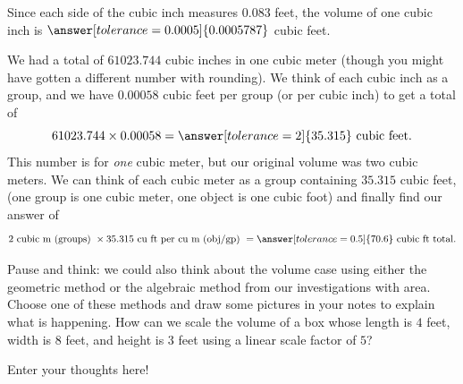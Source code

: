 \documentclass{ximera}
\begin{document}
\begin{question}
\begin{explanation}
\begin{image}
\begin{tikzpicture}
\end{tikzpicture}
\end{image}
Since each side of the cubic inch measures $0.083$ feet, the volume of one cubic inch is $\answer[tolerance=0.0005]{0.0005787}$ cubic feet.

We had a total of $61023.744$ cubic inches in one cubic meter (though you might have gotten a different number with rounding). We think of each cubic inch as a group, and we have  $0.00058$ cubic feet per group (or per cubic inch) to get a total of
\[
61023.744 \times 0.00058 = \answer[tolerance=2]{35.315} \textrm{ cubic feet.}
\]
This number is for \emph{one} cubic meter, but our original volume was two cubic meters. We can think of each cubic meter as a group containing $35.315$ cubic feet, (one group is one cubic meter, one object is one cubic foot) and finally find our answer of
\[
2 \textrm{ cubic m (groups) } \times 35.315 \textrm{ cu ft per cu m (obj/gp) } = \answer[tolerance=0.5]{70.6} \textrm{ cubic ft total.}
\]

\end{explanation}
\end{question}

\begin{question}
Pause and think: we could also think about the volume case using either the geometric method or the algebraic method from our investigations with area. Choose one of these methods and draw some pictures in your notes to explain what is happening. How can we scale the volume of a box whose length is $4$ feet, width is $8$ feet, and height is $3$ feet using a linear scale factor of $5$?
\begin{freeResponse}
Enter your thoughts here!
\end{freeResponse}
\end{question}
\end{document}
